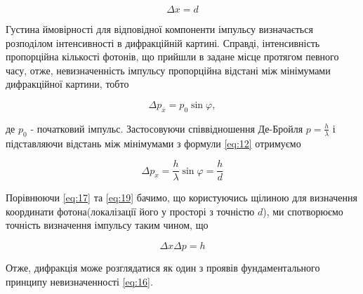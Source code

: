 \begin{equation} \label{eq:17}
    \Delta x = d
\end{equation}

Густина ймовірності для відповідної компоненти імпульсу
визначається розподілом інтенсивності в дифракційній картині.
Справді, інтенсивність пропорційна кількості фотонів, що 
прийшли в задане місце протягом певного часу, отже,
невизначенність імпульсу пропорційна відстані між
мінімумами дифракційної картини, тобто

\begin{equation} \label{eq:18}
    \Delta p_x = p_0 \sin{\varphi},
\end{equation}

де $p_0$ - початковий імпульс. Застосовуючи співвідношення
Де-Бройля $p = \frac{h}{\lambda}$ і підставляючи відстань між
мінімумами з формули \ref{eq:12} отримуємо

\begin{equation} \label{eq:19}
    \Delta p_x = \frac{h}{\lambda} \sin{\varphi} = \frac{h}{d}
\end{equation}

Порівнюючи \ref{eq:17} та \ref{eq:19} бачимо, що користуючись
щілиною для визначення координати фотона(локалізації його
у просторі з точністю $d$), ми спотворюємо точність визначення
імпульсу таким чином, що

$$ \Delta x \Delta p = h $$

Отже, дифракція може розглядатися як один з проявів
фундаментального принципу невизначенності \ref{eq:16}.
